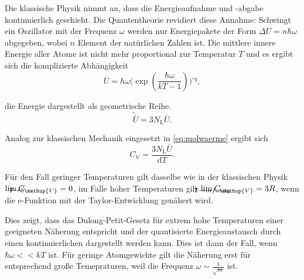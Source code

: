 Die klassische Physik nimmt an, dass die Energieaufnahme und -abgabe kontinuierlich geschieht. Die Quantentheorie revidiert diese Annahme: Schwingt ein Oszillator mit der Frequenz $\omega$ werden nur Energiepakete der Form $\Delta{U}=n \hbar \omega$ abgegeben, wobei $n$ Element der natürlichen Zahlen ist. 
Die mittlere innere Energie aller Atome ist nicht mehr proportional zur Temperatur $T$ und es ergibt sich die komplizierte Abhängigkeit
\begin{equation}
{\bar{U}=\hbar\omega(\exp(\frac{\hbar\omega}{kT-1})})⁻¹,
\end{equation}

die Energie dargestellt als geometrische Reihe.
\begin{equation}
\tilde{{\bar{U}}}=3N_\mathup{L}\bar{U}.
\end{equation}

 Analog zur klassischen Mechanik eingesetzt in \eqref{eq:molwaerme} ergibt sich 
\begin{equation}
C_\mathup{V}=\frac{3N_\mathup{L}\bar{U}}{\mathup{d}T}.
\end{equation}

Für den Fall geringer Temperaturen gilt dasselbe wie in der klassischen Physik $\lim_{\mathclap{T \to{0}}}C_\mathup{V}=0$, im Falle hoher Temperaturen gilt $\lim_{\mathclap{T \to{infinity}}}C_\mathup{V}=3R$, wenn die e-Funktion mit der Taylor-Entwicklung genähert wird.

Dies zeigt, dass das Dulong-Petit-Gesetz für extrem hohe Temperaturen einer geeigneten Näherung entspricht und der quantisierte Energieaustausch durch einen kontinuierlichen dargestellt werden kann. Dies ist dann der Fall, wenn $\hbar\omega<<kT$ ist. 
Für geringe Atomgewichte gilt die Näherung erst für entsprechend große Temepraturen, weil die Frequenz $\omega\sim \frac{1}{\sqrt{m}}$ ist.

